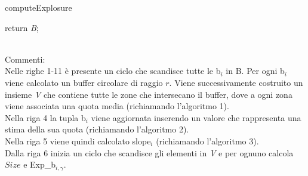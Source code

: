 \begin{algorithm}[H]
	

	\IncMargin{1em}
	\caption{computeExplosure}
	\label{alg:one}
	\BlankLine
	
	\SetAlgoNoLine
	


	return \textit{B}; \\
	

\end{algorithm}
\mbox{}\\
Commenti:\\
Nelle righe 1-11 è presente un ciclo che scandisce tutte le b$_i$ in B.
Per ogni b$_i$ viene calcolato un buffer circolare di raggio $r$.  Viene successivamente costruito un insieme \textit{V}  che contiene tutte le zone che intersecano il buffer, dove a ogni zona viene associata una quota media (richiamando l'algoritmo 1).\\ 
Nella riga 4 la tupla b$_i$ viene aggiornata inserendo un valore che rappresenta una stima della sua quota (richiamando l'algoritmo 2).\\
Nella riga 5 viene quindi calcolato slope$_i$ (richiamando l'algoritmo 3).\\
Dalla riga 6 inizia un ciclo che scandisce gli elementi in \textit{V} e per ognuno calcola $Size$ e Exp\_b$_{i,\gamma}$.\\
